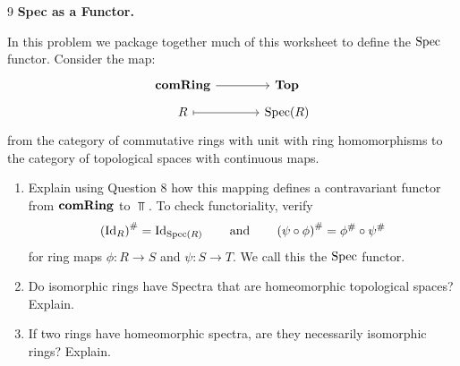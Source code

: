 \documentclass[Notebook.tex]{subfiles}
\begin{document}
\hrulefill

\newpage 

\begin{problem}{9} \textbf{Spec as a Functor.} 
    
    In this problem we package together much of this worksheet to define the $\operatorname{Spec}$ functor. Consider the map:
    \[
    \begin{tikzcd}[row sep  = .5em, column sep = 3.5em]
    \comRing \arrow[r] & \Top \\
    R \arrow[r, mapsto] & \Spec(R)
    \end{tikzcd}
    \]
    from the category of commutative rings with unit with ring homomorphisms to the category of topological spaces with continuous maps. 
    \begin{enumerate}[label=(\alph*),ref=\theenumi\alph*]
        \item Explain using Question 8 how this mapping defines a contravariant functor from $\operatorname{\textbf{comRing}}$ to $\Top$. To check functoriality, verify 
        \[
        \left(\operatorname{Id}_{R}\right)^{\#} = \operatorname{Id}_{\operatorname{Spec}(R)} \quad \quad \text{and} \quad \quad \left(\psi \circ \phi\right)^{\#} = \phi^{\#} \circ \psi^{\#}
        \]
        for ring maps $\phi:R\to S$ and $\psi:S\to T$.   We call this the $\operatorname{Spec}$ functor.
        \item Do isomorphic rings have Spectra that are homeomorphic topological spaces? Explain.
        \item If two rings have homeomorphic spectra, are they necessarily isomorphic rings? Explain.
    \end{enumerate}
\end{problem}
\end{document}
